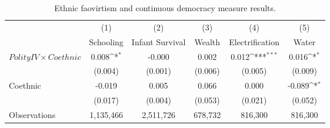 \begin{table}[htbp]\centering
\def\sym#1{\ifmmode^{#1}\else\(^{#1}\)\fi}
\caption{Ethnic faovirtism and continuous democracy measure results.}
\begin{adjustbox}{max width=\textwidth}
\begin{threeparttable}[t]
  \centering
\begin{tabular}{l*{5}{c}}
\hline
                    &\multicolumn{1}{c}{(1)}&\multicolumn{1}{c}{(2)}&\multicolumn{1}{c}{(3)}&\multicolumn{1}{c}{(4)}&\multicolumn{1}{c}{(5)}\\
                    &\multicolumn{1}{c}{Schooling}&\multicolumn{1}{c}{Infant Survival}&\multicolumn{1}{c}{Wealth}&\multicolumn{1}{c}{Electrification}&\multicolumn{1}{c}{Water}\\
\midrule
$PolityIV \times Coethnic$ &        0.008\sym{*}  &      -0.000         &       0.002         &       0.012\sym{***}&       0.016\sym{*}  \\
                    &     (0.004)         &     (0.001)         &     (0.006)         &     (0.005)         &     (0.009)         \\
\addlinespace
Coethnic            &      -0.019         &       0.005         &       0.066         &       0.000         &      -0.089\sym{*}  \\
                    &     (0.017)         &     (0.004)         &     (0.053)         &     (0.021)         &     (0.052)         \\
\midrule
Observations        & 1,135,466         & 2,511,726         &  678,732         &  816,300         &  816,300         \\


\end{tabular}
\end{threeparttable}
\end{adjustbox}
\end{table}

